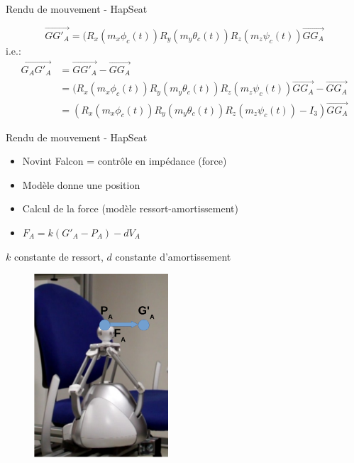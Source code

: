 \documentclass[compress, noflama]{beamer}
\begin{document}
\begin{frame}{Rendu de mouvement - HapSeat}

\begin{equation}
\overrightarrow{GG'_A} = (R_x(m_x \phi_c(t)) R_y(m_y \theta_c(t)) R_z(m_z \psi_c(t))\overrightarrow{GG_A}
\end{equation}
i.e.:
\begin{subequations}
\begin{align}
\overrightarrow{G_AG'_A}& = \overrightarrow{GG'_A} - \overrightarrow{GG_A}\\
&=(R_x(m_x \phi_c(t)) R_y(m_y \theta_c(t)) R_z(m_z \psi_c(t))\overrightarrow{GG_A} - \overrightarrow{GG_A}\\
&=(R_x(m_x \phi_c(t)) R_y(m_y \theta_c(t)) R_z(m_z \psi_c(t))-I_3)\overrightarrow{GG_A}
\end{align}
\end{subequations}

\end{frame}
 
\begin{frame}{Rendu de mouvement - HapSeat}
\begin{multicols}{2}
\begin{itemize}
\item Novint Falcon = contrôle en impédance (force)
\item Modèle donne une position
\item Calcul de la force (modèle ressort-amortissement)
\item $F_A = k(G'_A - P_A) - d V_A$
\end{itemize}
\footnotesize{$k$ constante de ressort, $d$ constante d'amortissement}

\begin{figure}
\centering
\includegraphics[width=5cm]{images/falcon}
\end{figure}


\end{multicols}
\end{frame}
 
\end{document}
